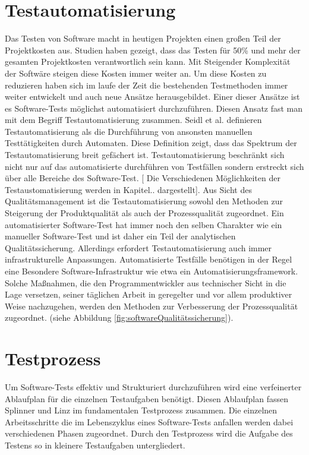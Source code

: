 \section{Testautomatisierung}
\label{sec:testautoGrundlagen}
Das Testen von Software macht in heutigen Projekten einen großen Teil der Projektkosten aus. Studien haben gezeigt, dass das Testen für 50\% 
und mehr der gesamten Projektkosten verantwortlich sein kann. 
Mit Steigender Komplexität der Softwäre steigen diese Kosten immer weiter an. \cite{ramler_economic_2006} \cite{harrold_testing:_2000}
Um diese Kosten zu reduzieren haben sich im laufe der Zeit die bestehenden Testmethoden immer weiter entwickelt und auch neue Ansätze herausgebildet. Einer dieser Ansätze ist es Software-Tests möglichst automatisiert durchzuführen.  \cite{harrold_testing:_2000} Diesen Ansatz fast man mit dem Begriff Testautomatisierung zusammen.
Seidl et al. definieren Testautomatisierung als \glqq die Durchführung von ansonsten manuellen Testtätigkeiten durch Automaten.\grqq \cite[S.7]{seidl_basiswissen_2012}
Diese Definition zeigt, dass das Spektrum der Testautomatisierung breit gefächert ist. Testautomatisierung beschränkt sich nicht nur auf das automatisierte durchführen von Testfällen sondern erstreckt sich über alle Bereiche des Software-Test. [ Die Verschiedenen Möglichkeiten der Testaustomatisierung werden in Kapitel.. dargestellt].
Aus Sicht des Qualitätsmanagement ist die Testautomatisierung sowohl den Methoden zur Steigerung der Produktqualität als auch der Prozessqualität zugeordnet. Ein automatisierter Software-Test hat immer noch den selben Charakter wie ein manueller Software-Test und ist daher ein Teil der analytischen Qualitätssicherung. Allerdings erfordert Testautomatisierung auch immer infrastrukturelle Anpassungen. Automatisierte Testfälle benötigen in der Regel eine Besondere Software-Infrastruktur wie etwa ein Automatisierungsframework. Solche Maßnahmen, die den Programmentwickler aus technischer Sicht in die Lage versetzen, seiner täglichen Arbeit in geregelter und vor allem produktiver Weise nachzugehen, werden den Methoden zur Verbesserung der Prozessqualität zugeordnet. (siehe Abbildung \ref{fig:softwareQualitätssicherung}).
\cite[vgl. Seite 25]{hoffmann_software-qualitat_2013}


\section{Testprozess}
\label{sec:testprozess}

Um Software-Tests effektiv und Strukturiert durchzuführen wird eine verfeinerter Ablaufplan für die einzelnen Testaufgaben benötigt. Diesen Ablaufplan fassen Splinner und Linz im fundamentalen Testprozess zusammen. Die einzelnen Arbeitsschritte die im Lebenszyklus eines Software-Tests anfallen werden dabei verschiedenen Phasen zugeordnet.
Durch den Testprozess wird die Aufgabe des Testens so in kleinere Testaufgaben untergliedert.

